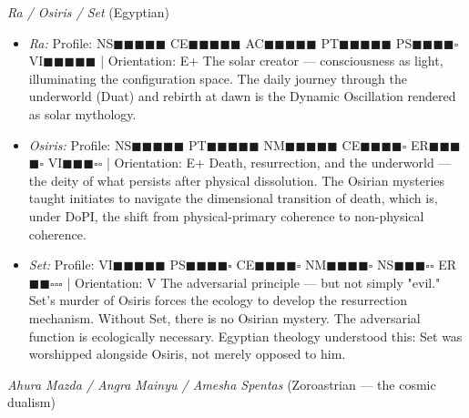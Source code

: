 \textit{Ra / Osiris / Set} (Egyptian)

\begin{itemize}[nosep,leftmargin=*]
  \item \textit{Ra:} Profile: NS$\blacksquare$$\blacksquare$$\blacksquare$$\blacksquare$$\blacksquare$ CE$\blacksquare$$\blacksquare$$\blacksquare$$\blacksquare$$\blacksquare$ AC$\blacksquare$$\blacksquare$$\blacksquare$$\blacksquare$$\blacksquare$ PT$\blacksquare$$\blacksquare$$\blacksquare$$\blacksquare$$\blacksquare$ PS$\blacksquare$$\blacksquare$$\blacksquare$$\blacksquare$$\square$ VI$\blacksquare$$\blacksquare$$\blacksquare$$\blacksquare$$\blacksquare$ | Orientation: E+ The solar creator — consciousness as light, illuminating the configuration space. The daily journey through the underworld (Duat) and rebirth at dawn is the Dynamic Oscillation rendered as solar mythology.
  \item \textit{Osiris:} Profile: NS$\blacksquare$$\blacksquare$$\blacksquare$$\blacksquare$$\blacksquare$ PT$\blacksquare$$\blacksquare$$\blacksquare$$\blacksquare$$\blacksquare$ NM$\blacksquare$$\blacksquare$$\blacksquare$$\blacksquare$$\blacksquare$ CE$\blacksquare$$\blacksquare$$\blacksquare$$\blacksquare$$\square$ ER$\blacksquare$$\blacksquare$$\blacksquare$$\blacksquare$$\square$ VI$\blacksquare$$\blacksquare$$\blacksquare$$\square$$\square$ | Orientation: E+ Death, resurrection, and the underworld — the deity of what persists after physical dissolution. The Osirian mysteries taught initiates to navigate the dimensional transition of death, which is, under DoPI, the shift from physical-primary coherence to non-physical coherence.
  \item \textit{Set:} Profile: VI$\blacksquare$$\blacksquare$$\blacksquare$$\blacksquare$$\blacksquare$ PS$\blacksquare$$\blacksquare$$\blacksquare$$\blacksquare$$\square$ CE$\blacksquare$$\blacksquare$$\blacksquare$$\blacksquare$$\square$ NM$\blacksquare$$\blacksquare$$\blacksquare$$\blacksquare$$\square$ NS$\blacksquare$$\blacksquare$$\blacksquare$$\square$$\square$ ER$\blacksquare$$\blacksquare$$\square$$\square$$\square$ | Orientation: V The adversarial principle — but not simply "evil." Set's murder of Osiris forces the ecology to develop the resurrection mechanism. Without Set, there is no Osirian mystery. The adversarial function is ecologically necessary. Egyptian theology understood this: Set was worshipped alongside Osiris, not merely opposed to him.
\end{itemize}


\textit{Ahura Mazda / Angra Mainyu / Amesha Spentas} (Zoroastrian — the cosmic dualism)


